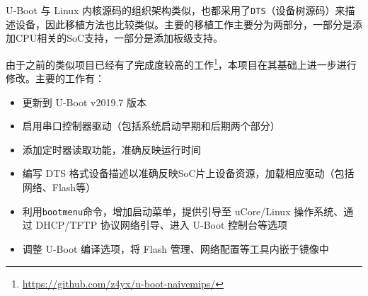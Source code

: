 U-Boot 与 Linux 内核源码的组织架构类似，也都采用了\texttt{DTS}（设备树源码）来描述设备，因此移植方法也比较类似。主要的移植工作主要分为两部分，一部分是添加CPU相关的SoC支持，一部分是添加板级支持。

由于之前的类似项目已经有了完成度较高的工作\footnote{\url{https://github.com/z4yx/u-boot-naivemips/}}，本项目在其基础上进一步进行修改。主要的工作有：

\begin{itemize}
    \item 更新到 U-Boot v2019.7 版本
    \item 启用串口控制器驱动（包括系统启动早期和后期两个部分）
    \item 添加定时器读取功能，准确反映运行时间
    \item 编写 DTS 格式设备描述以准确反映SoC片上设备资源，加载相应驱动（包括网络、Flash等）
    \item 利用\texttt{bootmenu}命令，增加启动菜单，提供引导至 uCore/Linux 操作系统、通过 DHCP/TFTP 协议网络引导、进入 U-Boot 控制台等选项
    \item 调整 U-Boot 编译选项，将 Flash 管理、网络配置等工具内嵌于镜像中
\end{itemize}

